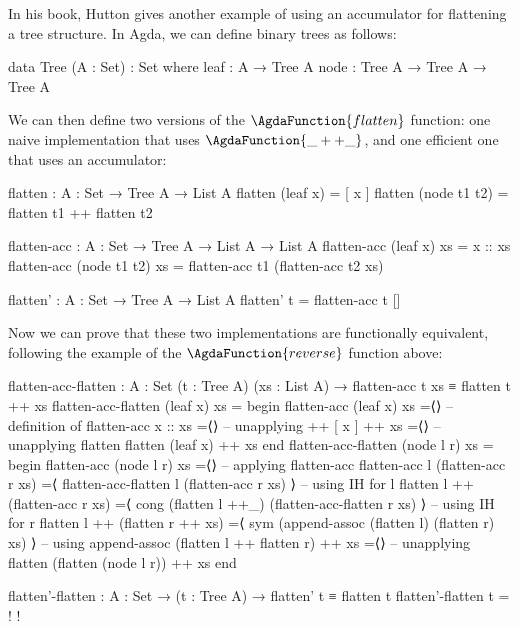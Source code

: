 \documentclass[a4paper,UKenglish]{tufte-handout}
\theoremstyle{definition}
\newcommand\fun[1]{{\AgdaFunction{#1}}}
\begin{document}
In his book, Hutton gives another example of using
an accumulator for flattening a tree structure. In Agda, we can define
binary trees as follows:
\begin{code}[number]
data Tree (A : Set) : Set where
  leaf  : A → Tree A
  node  : Tree A → Tree A → Tree A
\end{code}
We can then define two versions of the $\fun{flatten}$ function: one
naive implementation that uses $\fun{\_++\_}$, and one efficient one
that uses an accumulator:
\begin{AgdaAlign}
\begin{AgdaSuppressSpace}
\begin{code}[number]
flatten : {A : Set} → Tree A → List A
flatten (leaf x)      = [ x ]
flatten (node t1 t2)  = flatten t1 ++ flatten t2

\end{code}
\begin{code}[number]
flatten-acc : {A : Set} → Tree A → List A → List A
flatten-acc (leaf x)      xs  = x :: xs
flatten-acc (node t1 t2)  xs  =
  flatten-acc t1 (flatten-acc t2 xs)

\end{code}
\begin{code}[number]
flatten' : {A : Set} → Tree A → List A
flatten' t = flatten-acc t []
\end{code}
\end{AgdaSuppressSpace}
\end{AgdaAlign}
Now we can prove that these two implementations are functionally equivalent,
following the example of the $\fun{reverse}$ function above:
\begin{fullwidth}\begin{AgdaAlign}
\begin{code}[number]
flatten-acc-flatten : {A : Set} (t : Tree A) (xs : List A) → flatten-acc t xs ≡ flatten t ++ xs
flatten-acc-flatten (leaf x)   xs =
  begin
    flatten-acc (leaf x) xs
  =⟨⟩                                                   -- definition of flatten-acc
    x :: xs
  =⟨⟩                                                   -- unapplying ++
    [ x ] ++ xs
  =⟨⟩                                                   -- unapplying flatten
    flatten (leaf x) ++ xs
  end
flatten-acc-flatten (node l r) xs =
  begin
    flatten-acc (node l r) xs
  =⟨⟩                                                   -- applying flatten-acc
    flatten-acc l (flatten-acc r xs)
  =⟨ flatten-acc-flatten l (flatten-acc r xs) ⟩         -- using IH for l
    flatten l ++ (flatten-acc r xs)
  =⟨ cong (flatten l ++_) (flatten-acc-flatten r xs) ⟩  -- using IH for r
    flatten l ++ (flatten r ++ xs)
  =⟨ sym (append-assoc (flatten l) (flatten r) xs) ⟩    -- using append-assoc
    (flatten l ++ flatten r) ++ xs
  =⟨⟩                                                   -- unapplying flatten
    (flatten (node l r)) ++ xs
  end

flatten'-flatten : {A : Set} → (t : Tree A) → flatten' t ≡ flatten t
flatten'-flatten t = {!  !}
\end{code}
\end{AgdaAlign}\end{fullwidth}
\end{document}
